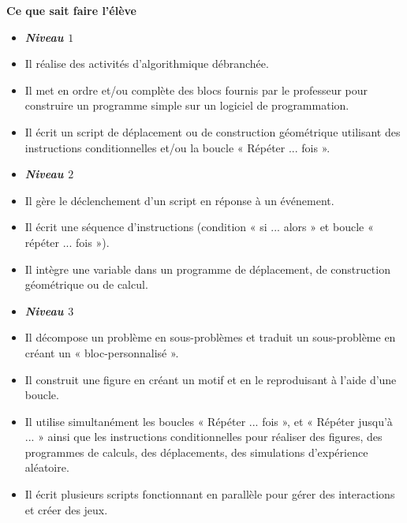 \documentclass[10pt]{article}
\newcommand{\RR}{\begin{tikzpicture} \draw[BleuRoi,fill=BleuRoi] (0,0) circle (0.06); \end{tikzpicture}}
\newenvironment{savoireleves}{%
    \renewcommand{\labelitemi}{\RR}%
    \color{black}%
    \par\textbf{Ce que sait faire l'élève}
    \begin{itemize}
    \setlength{\itemsep}{-0.2em}%
}{
    \end{itemize}
}
\begin{document}
    \begin{savoireleves}
        \item[] \textbf{\textit{Niveau $1$}}
        \item Il réalise des activités d’algorithmique débranchée.
        \item Il met en ordre et/ou complète des blocs fournis par le professeur pour construire un programme simple sur un logiciel de programmation.
        \item Il écrit un script de déplacement ou de construction géométrique utilisant des instructions conditionnelles et/ou la boucle « Répéter ... fois ».
        \item[] \textbf{\textit{Niveau $2$}}
        \item Il gère le déclenchement d'un script en réponse à un événement.
        \item Il écrit une séquence d’instructions (condition « si ... alors » et boucle « répéter ... fois »).
        \item Il intègre une variable dans un programme de déplacement, de construction géométrique ou de calcul.
        \item[] \textbf{\textit{Niveau $3$}}
        \item Il décompose un problème en sous-problèmes et traduit un sous-problème en créant un « bloc-personnalisé ».
        \item Il construit une figure en créant un motif et en le reproduisant à l’aide d’une boucle.
        \item Il utilise simultanément les boucles « Répéter ... fois », et « Répéter jusqu’à ... » ainsi que les instructions conditionnelles pour réaliser des figures, des programmes de calculs, des déplacements, des simulations d’expérience aléatoire.
        \item Il écrit plusieurs scripts fonctionnant en parallèle pour gérer des interactions et créer des jeux.
    \end{savoireleves}
\end{document}
